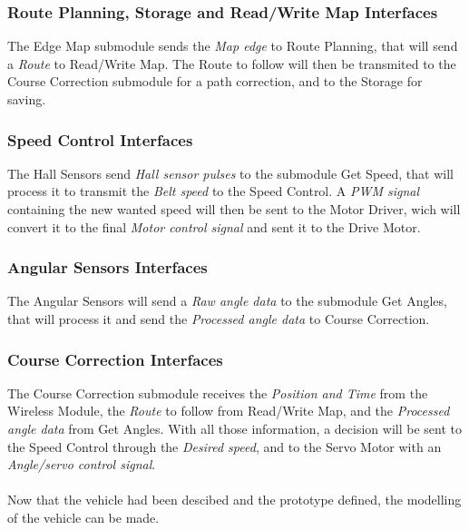 \subsubsection{Route Planning, Storage and Read/Write Map Interfaces}
The Edge Map submodule sends the \textit{Map edge} to Route Planning, that will send a \textit{Route} to Read/Write Map. The Route to follow will then be transmited to the Course Correction submodule for a path correction, and to the Storage for saving.

\subsubsection{Speed Control Interfaces}
The Hall Sensors send \textit{Hall sensor pulses} to the submodule Get Speed, that will process it to transmit the \textit{Belt speed} to the Speed Control. A \textit{PWM signal} containing the new wanted speed will then be sent to the Motor Driver, wich will convert it to the final \textit{Motor control signal} and sent it to the Drive Motor.

\subsubsection{Angular Sensors Interfaces}
The Angular Sensors will send a \textit{Raw angle data} to the submodule  Get Angles, that will process it and send the \textit{Processed angle data} to Course Correction.

\subsubsection{Course Correction Interfaces}
The Course Correction submodule receives the \textit{Position and Time} from the Wireless Module, the \textit{Route} to follow from Read/Write Map, and the \textit{Processed angle data} from Get Angles. With all those information, a decision will be sent to the Speed Control through the \textit{Desired speed}, and to the Servo Motor with an \textit{Angle/servo control signal}.\\\\


Now that the vehicle had been descibed and the prototype defined, the modelling of the vehicle can be made.



